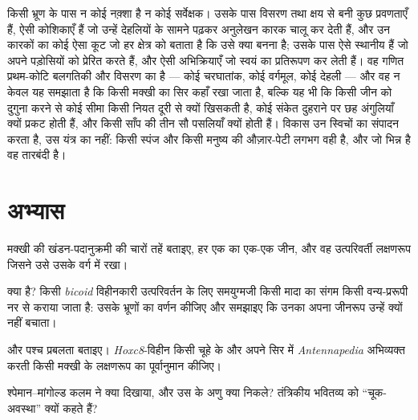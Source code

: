 \begin{remark}[रसायन से ज्यामिति]\label{rem:b3:developmental-genetics:remark}
किसी भ्रूण के पास न कोई नक़्शा है न कोई सर्वेक्षक। उसके पास विसरण तथा
क्षय से बनी कुछ प्रवणताएँ हैं, ऐसी कोशिकाएँ हैं जो उन्हें देहलियों के
सामने पढ़कर अनुलेखन कारक चालू कर देती हैं, और उन कारकों का कोई ऐसा कूट
जो हर क्षेत्र को बताता है कि उसे क्या बनना है; उसके पास ऐसे स्थानीय
 हैं जो अपने पड़ोसियों को प्रेरित करते हैं, और ऐसी अभिक्रियाएँ जो
स्वयं का प्रतिरूपण कर लेती हैं। वह गणित प्रथम-कोटि बलगतिकी और विसरण का
है --- कोई चरघातांक, कोई वर्गमूल, कोई देहली --- और वह न केवल यह समझाता
है कि किसी मक्खी का सिर कहाँ रखा जाता है, बल्कि यह भी कि किसी जीन को
दुगुना करने से कोई सीमा किसी नियत दूरी से क्यों खिसकती है, कोई संकेत
दुहराने पर छह अंगुलियाँ क्यों प्रकट होती हैं, और किसी साँप की तीन सौ
पसलियाँ क्यों होती हैं। विकास उन स्विचों का संपादन करता है, उस यंत्र का
नहीं: किसी स्पंज और किसी मनुष्य की औज़ार-पेटी लगभग वही है, और जो भिन्न
है वह तारबंदी है।
\end{remark}

\section{अभ्यास}

\begin{exercise}[$\star$]\label{exo:b3:developmental-genetics:1}
मक्खी की खंडन-पदानुक्रमी की चारों तहें बताइए, हर एक का एक-एक जीन, और वह
उत्परिवर्ती लक्षणरूप जिसने उसे उसके वर्ग में रखा।
\end{exercise}

\begin{exercise}[$\star$]\label{exo:b3:developmental-genetics:2}
 क्या है? किसी \emph{bicoid} विहीनकारी उत्परिवर्तन के
लिए समयुग्मजी किसी मादा का संगम किसी वन्य-प्ररूपी नर से कराया जाता है:
उसके भ्रूणों का वर्णन कीजिए और समझाइए कि उनका अपना जीनरूप उन्हें क्यों
नहीं बचाता।
\end{exercise}

\begin{exercise}[$\star$]\label{exo:b3:developmental-genetics:3}
 और पश्च प्रबलता बताइए। \emph{Hoxc8}-विहीन किसी चूहे के और
अपने सिर में \emph{Antennapedia} अभिव्यक्त करती किसी मक्खी के लक्षणरूप
का पूर्वानुमान कीजिए।
\end{exercise}

\begin{exercise}[$\star$]\label{exo:b3:developmental-genetics:4}
श्पेमान--मांगोल्ड कलम ने क्या दिखाया, और उस  के अणु क्या निकले?
तंत्रिकीय भवितव्य को ``चूक-अवस्था'' क्यों कहते हैं?
\end{exercise}

